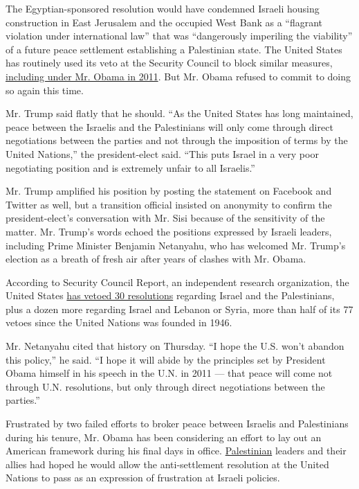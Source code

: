The Egyptian-sponsored resolution would have condemned Israeli housing
construction in East Jerusalem and the occupied West Bank as a
``flagrant violation under international law'' that was ``dangerously
imperiling the viability'' of a future peace settlement establishing a
Palestinian state. The United States has routinely used its veto at the
Security Council to block similar measures,
\href{http://www.nytimes.com/2011/02/19/world/middleeast/19nations.html}{including
under Mr. Obama in 2011}. But Mr. Obama refused to commit to doing so
again this time.

Mr. Trump said flatly that he should. ``As the United States has long
maintained, peace between the Israelis and the Palestinians will only
come through direct negotiations between the parties and not through the
imposition of terms by the United Nations,'' the president-elect said.
``This puts Israel in a very poor negotiating position and is extremely
unfair to all Israelis.''

Mr. Trump amplified his position by posting the statement on Facebook
and Twitter as well, but a transition official insisted on anonymity to
confirm the president-elect's conversation with Mr. Sisi because of the
sensitivity of the matter. Mr. Trump's words echoed the positions
expressed by Israeli leaders, including Prime Minister Benjamin
Netanyahu, who has welcomed Mr. Trump's election as a breath of fresh
air after years of clashes with Mr. Obama.

According to Security Council Report, an independent research
organization, the United States
\href{http://www.securitycouncilreport.org/atf/cf/\%7B65BFCF9B-6D27-4E9C-8CD3-CF6E4FF96FF9\%7D/SCR-veto-insert-2.pdf}{has
vetoed 30 resolutions} regarding Israel and the Palestinians, plus a
dozen more regarding Israel and Lebanon or Syria, more than half of its
77 vetoes since the United Nations was founded in 1946.

Mr. Netanyahu cited that history on Thursday. ``I hope the U.S. won't
abandon this policy,'' he said. ``I hope it will abide by the principles
set by President Obama himself in his speech in the U.N. in 2011 ---
that peace will come not through U.N. resolutions, but only through
direct negotiations between the parties.''

Frustrated by two failed efforts to broker peace between Israelis and
Palestinians during his tenure, Mr. Obama has been considering an effort
to lay out an American framework during his final days in office.
\href{http://topics.nytimes.com/top/reference/timestopics/subjects/p/palestinians/index.html?inline=nyt-classifier}{Palestinian}
leaders and their allies had hoped he would allow the anti-settlement
resolution at the United Nations to pass as an expression of frustration
at Israeli policies.

